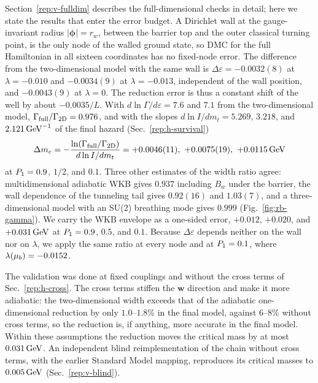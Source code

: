 Section~\ref{rep:v-fulldim} describes the full-dimensional checks in detail; here we state the results that enter the error budget.
A Dirichlet wall at the gauge-invariant radius $|\bm\phi|=r_w$, between the barrier top and the outer classical turning point, is the only node of the walled ground state, so DMC for the full Hamiltonian in all sixteen coordinates has no fixed-node error.
The difference from the two-dimensional model with the same wall is $\Delta\varepsilon=-0.0032(8)$ at $\lambda=-0.010$ and $-0.0034(9)$ at $\lambda=-0.013$, independent of the wall position, and $-0.0043(9)$ at $\lambda=0$. %
The reduction error is thus a constant shift of the well by about $-0.0035/L$. %
With $d\ln\Gamma/d\varepsilon=7.6$ and $7.1$ from the two-dimensional model, $\Gamma_{\rm full}/\Gamma_{\rm 2D}=0.976$, and with the slopes $d\ln I/dm_t=5.269$, $3.218$, and $2.121\,\mathrm{GeV}^{-1}$ of the final hazard (Sec.~\ref{rep:h-survival}) %
\begin{equation}
\Delta m_c=-\frac{\ln(\Gamma_{\rm full}/\Gamma_{\rm 2D})}{d\ln I/dm_t}=+0.0046(11),\ +0.0075(19),\ +0.0115\GeV %
\label{eq:rb-dmc-conv}
\end{equation}
at $P_1=0.9$, $1/2$, and $0.1$.
Three other estimates of the width ratio agree: multidimensional adiabatic WKB gives $0.937$ including $B_w$ under the barrier, the wall dependence of the tunneling tail gives $0.92(16)$ and $1.03(7)$, and a three-dimensional model with an SU(2) breathing mode gives $0.999$ (Fig.~\ref{fig:rb-gamma}). %
We carry the WKB envelope as a one-sided error, $+0.012$, $+0.020$, and $+0.031\,\mathrm{GeV}$ at $P_1=0.9$, $0.5$, and $0.1$. %
Because $\Delta\varepsilon$ depends neither on the wall nor on $\lambda$, we apply the same ratio at every node and at $P_1=0.1$, where $\lambda(\mu_b)=-0.0152$. %

The validation was done at fixed couplings and without the cross terms of Sec.~\ref{rep:h-cross}.
The cross terms stiffen the $\bm w$ direction and make it more adiabatic: the two-dimensional width exceeds that of the adiabatic one-dimensional reduction by only $1.0$--$1.8\%$ in the final model, against $6$--$8\%$ without cross terms, so the reduction is, if anything, more accurate in the final model. %
Within these assumptions the reduction moves the critical mass by at most $0.031\,\mathrm{GeV}$. %
An independent blind reimplementation of the chain without cross terms, with the earlier Standard Model mapping, reproduces its critical masses to $0.005\,\mathrm{GeV}$ (Sec.~\ref{rep:v-blind}). %

